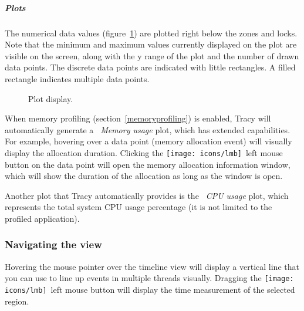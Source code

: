 \documentclass[hidelinks,titlepage,a4paper,twoside]{article}
\newcommand{\LMB}{\texttt{[image: icons/lmb]}}
\begin{document}
\subparagraph{Plots}
\label{plots}

The numerical data values (figure~\ref{plot}) are plotted right below the zones and locks. Note that the minimum and maximum values currently displayed on the plot are visible on the screen, along with the y range of the plot and the number of drawn data points. The discrete data points are indicated with little rectangles. A filled rectangle indicates multiple data points.

\begin{figure}[h]
\centering{}
\caption{Plot display.}
\label{plot}
\end{figure}

When memory profiling (section~\ref{memoryprofiling}) is enabled, Tracy will automatically generate a \emph{\faMemory{}~Memory usage} plot, which has extended capabilities. For example, hovering over a data point (memory allocation event) will visually display the allocation duration. Clicking the \LMB{}~left mouse button on the data point will open the memory allocation information window, which will show the duration of the allocation as long as the window is open.

Another plot that Tracy automatically provides is the \emph{\faTachometer*{}~CPU usage} plot, which represents the total system CPU usage percentage (it is not limited to the profiled application).

\subsubsection{Navigating the view}

Hovering the \faMousePointer{} mouse pointer over the timeline view will display a vertical line that you can use to line up events in multiple threads visually. Dragging the \LMB{}~left mouse button will display the time measurement of the selected region.
\end{document}
